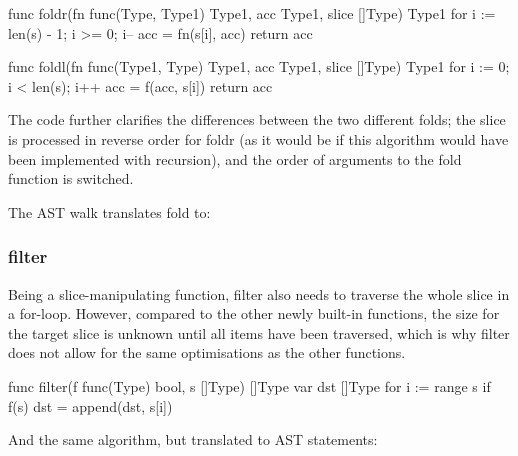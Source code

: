 \begin{code}
    \begin{gocode}
func foldr(fn func(Type, Type1) Type1, acc Type1, slice []Type) Type1 {
    for i := len(s) - 1; i >= 0; i-- {
        acc = fn(s[i], acc)
    }
    return acc
}

func foldl(fn func(Type1, Type) Type1, acc Type1, slice []Type) Type1 {
    for i := 0; i < len(s); i++ {
        acc = f(acc, s[i])
    }
    return acc
}
\end{gocode}
\end{code}
The code further clarifies the differences between the two different folds;
the slice is processed in reverse order for foldr (as it would be if this
algorithm would have been implemented with recursion), and the order of
arguments to the fold function is switched.

The AST walk translates fold to:
\begin{code}
\end{code}
\subsubsection{filter}\label{ch:impl-filter}

Being a slice-manipulating function, filter also needs to traverse the whole
slice in a for-loop. However, compared to the other newly built-in functions,
the size for the target slice is unknown until all items have been traversed,
which is why filter does not allow for the same optimisations as the other
functions.

\begin{code}
    \begin{gocode}
func filter(f func(Type) bool, s []Type) []Type {
    var dst []Type
    for i := range s {
            if f(s) {
                dst = append(dst, s[i])
            }
    }
}
    \end{gocode}
\end{code}
And the same algorithm, but translated to AST statements:

\begin{code}
\end{code}
